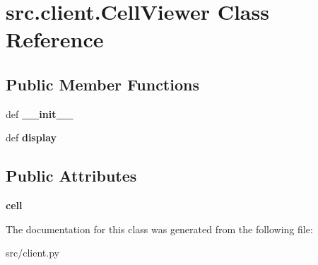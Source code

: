\hypertarget{classsrc_1_1client_1_1_cell_viewer}{\section{src.\-client.\-Cell\-Viewer \-Class \-Reference}
\label{classsrc_1_1client_1_1_cell_viewer}
}
\subsection*{\-Public \-Member \-Functions}
\begin{DoxyCompactItemize}
\item 
\hypertarget{classsrc_1_1client_1_1_cell_viewer_aa5a822a155b835af7a0d241b85570389}{def {\bfseries \-\_\-\-\_\-init\-\_\-\-\_\-}}\label{classsrc_1_1client_1_1_cell_viewer_aa5a822a155b835af7a0d241b85570389}

\item 
\hypertarget{classsrc_1_1client_1_1_cell_viewer_a90d9ee002c0cd825ec113fc64114299d}{def {\bfseries display}}\label{classsrc_1_1client_1_1_cell_viewer_a90d9ee002c0cd825ec113fc64114299d}

\end{DoxyCompactItemize}
\subsection*{\-Public \-Attributes}
\begin{DoxyCompactItemize}
\item 
\hypertarget{classsrc_1_1client_1_1_cell_viewer_a3ed0e66000843a6c72791bbe5fdab8af}{{\bfseries cell}}\label{classsrc_1_1client_1_1_cell_viewer_a3ed0e66000843a6c72791bbe5fdab8af}

\end{DoxyCompactItemize}


\-The documentation for this class was generated from the following file\-:\begin{DoxyCompactItemize}
\item 
src/client.\-py\end{DoxyCompactItemize}
